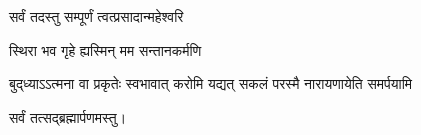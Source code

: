 
{सर्वं तदस्तु सम्पूर्णं त्वत्प्रसादान्महेश्वरि}

{स्थिरा भव गृहे ह्यस्मिन् मम सन्तानकर्मणि}


{बुद्‌ध्याऽऽत्मना वा प्रकृतेः स्वभावात्}
{करोमि यद्यत् सकलं परस्मै}
{नारायणायेति समर्पयामि}

\centerline{सर्वं तत्सद्ब्रह्मार्पणमस्तु।}

\closesub



\closesection
